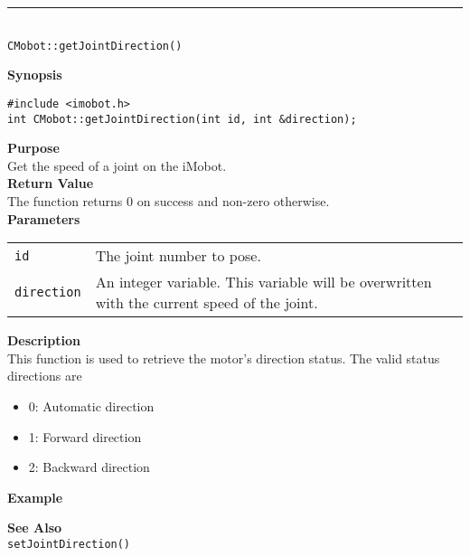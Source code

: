 \noindent
\vspace{5pt}
\rule{4.5in}{0.015in}\\
\noindent
{\LARGE \texttt{CMobot::getJointDirection()}}\\
{}

\noindent
{\bf Synopsis}\\
\begin{verbatim}
#include <imobot.h>
int CMobot::getJointDirection(int id, int &direction);
\end{verbatim}

\noindent
{\bf Purpose}\\
Get the speed of a joint on the iMobot.\\

\noindent
{\bf Return Value}\\
The function returns 0 on success and non-zero otherwise.\\

\noindent
{\bf Parameters}
\vspace{-0.1in}
\begin{description}
\item               
\begin{tabular}{p{10 mm}p{145 mm}}
\texttt{id} & The joint number to pose. \\
\texttt{direction} & An integer variable. This variable will be overwritten
with the current speed of the joint.
\end{tabular}
\end{description}

\noindent
{\bf Description}\\
This function is used to retrieve the motor's direction status. The valid
status directions are
\begin{itemize}
\item 0: Automatic direction
\item 1: Forward direction
\item 2: Backward direction
\end{itemize}

\noindent
{\bf Example}\\
\noindent

\noindent
{\bf See Also}\\
\texttt{setJointDirection()}

